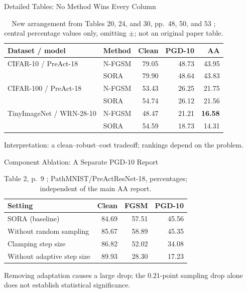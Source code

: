 \documentclass[11pt,aspectratio=169,professionalfonts]{beamer}
\begin{document}
\begin{frame}{Detailed Tables: No Method Wins Every Column}
\begin{table}
\centering\fontsize{12}{15}\selectfont\renewcommand{\arraystretch}{1.1}
\begin{tabular}{llrrr}
\toprule
Dataset / model & Method & Clean & PGD-10 & AA\\
\midrule
CIFAR-10 / PreAct-18 & N-FGSM &79.05&48.73&43.95\\
& SORA &79.90&48.64&43.83\\
CIFAR-100 / PreAct-18 & N-FGSM &53.43&26.25&21.75\\
& SORA &54.74&26.12&21.56\\
TinyImageNet / WRN-28-10 & N-FGSM &48.47&21.21&\bfseries16.58\\
& SORA &54.59&18.73&14.31\\
\bottomrule
\end{tabular}
\caption{New arrangement from Tables 20, 24, and 30, pp.\ 48, 50, and 53 \cite{sora2026}; central percentage values only, omitting $\pm$; not an original paper table.}
\end{table}
\centering Interpretation: a clean--robust--cost tradeoff; rankings depend on the problem.
\end{frame}

\begin{frame}{Component Ablation: A Separate PGD-10 Report}
\begin{table}
\centering\fontsize{12}{17}\selectfont\renewcommand{\arraystretch}{1.3}
\begin{tabular}{lrrr}
\toprule
Setting & Clean & FGSM & PGD-10\\
\midrule
SORA (baseline)&84.69&57.51&45.56\\
Without random sampling&85.67&58.89&45.35\\
Clamping step size&86.82&52.02&34.08\\
Without adaptive step size&89.93&28.30&17.23\\
\bottomrule
\end{tabular}
\caption{Table 2, p.\ 9 \cite{sora2026}; PathMNIST/PreActResNet-18, percentages; independent of the main AA report.}
\end{table}
\centering Removing adaptation causes a large drop; the $0.21$-point sampling drop alone does not establish statistical significance.
\end{frame}
\end{document}
